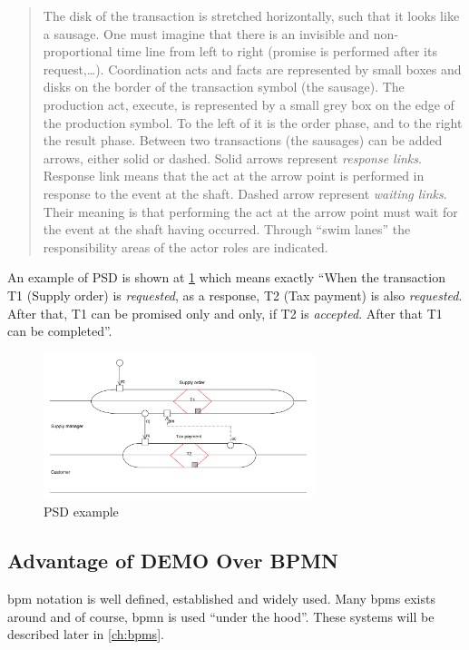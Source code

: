 \begin{quote}
      The disk of the transaction is stretched horizontally, such that it looks like a sausage. One must imagine that there is an invisible and non-proportional time line from left to right (promise is performed after its request,\dots). Coordination acts and facts are represented by small boxes and disks on the border of the transaction symbol (the sausage). 
      The production act, execute, is represented by a small grey box on the edge of the production symbol. To the left of it is the order phase, and to the right the result phase.
      Between two transactions (the sausages) can be added arrows, either solid or dashed. Solid arrows represent \textit{response links}. Response link means that the act at the arrow point is performed in response to the event at the shaft. Dashed arrow represent \textit{waiting links}. Their meaning is that performing the act at the arrow point must wait for the event at the shaft having occurred. Through ``swim lanes'' the responsibility areas of the actor roles are indicated.
\end{quote}
An example of PSD is shown at \cref{fig:psd-example} which means exactly ``When the transaction T1 (Supply order) is \textit{requested}, as a response, T2 (Tax payment) is also \textit{requested}. After that, T1 can be promised only and only, if T2 is \textit{accepted}. After that T1 can be completed''.

\begin{figure}[ht!]
	\centering
    \includegraphics[width=0.7\textwidth]{img/psd-example}
    \caption{PSD example}
    \label{fig:psd-example}
\end{figure}

\subsection{Advantage of DEMO Over BPMN}
    
\gls{bpm} notation is well defined, established and widely used. Many \gls{bpms} exists around and of course, \gls{bpmn} is used ``under the hood''. These systems will be described later in \cref{ch:bpms}.
    
